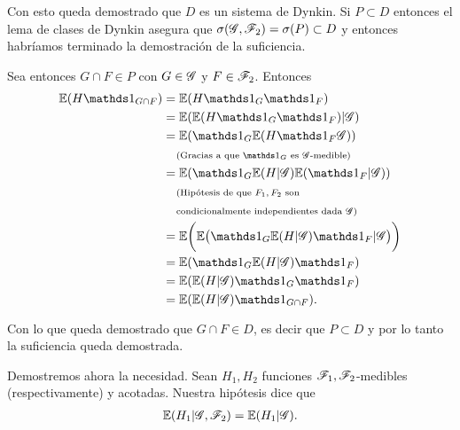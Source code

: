 Con esto queda demostrado que $D$ es un sistema de Dynkin. Si $P \subset D$ entonces el lema de clases de Dynkin asegura que
$\sigma(\mathscr{G}, \mathscr{F}_2) = \sigma(P) \subset D$ y entonces habríamos terminado la demostración de la suficiencia.\par\null

Sea entonces $G \cap F \in P$ con $G \in \mathscr{G}$ y $F \in \mathscr{F}_2$. Entonces
\begin{align}
        \E(H \indic_{G \cap F})     &=  \E(H \indic_G \indic_F)                                     \\
                                    &=  \E(\E(H \indic_G \indic_F) | \G)                            \\
                                    &=  \E(\indic_G \E(H \indic_F \G))                              \\
                                    &\comment{Gracias a que $\indic_G$ es $\G$-medible}             \\
                                    &=  \E(\indic_G \E(H | \G) \E(\indic_F | \G))                   \\
                                    &\lcomment{Hipótesis de que $F_1, F_2$ son}                     \\
                                    &\rcomment{condicionalmente independientes dada $\G$}           \\
                                    &=  \E\bigg(\E\big(\indic_G \E(H | \G) \indic_F | \G\big)\bigg) \\
                                    &=  \E(\indic_G \E(H | \G) \indic_F)                            \\
                                    &=  \E(\E(H | \G) \indic_G \indic_F)                            \\
                                    &=  \E(\E(H | \G) \indic_{G \cap F}).
\end{align}

Con lo que queda demostrado que $G \cap F \in D$, es decir que $P \subset D$ y por lo tanto la suficiencia queda demostrada.\par\null

Demostremos ahora la necesidad. Sean $H_1, H_2$ funciones $\mathscr{F}_1, \mathscr{F}_2$-medibles (respectivamente) y acotadas. Nuestra hipótesis dice que
\begin{align}
    \mathbb{E}(H_1 | \mathscr{G}, \mathscr{F}_2) = \mathbb{E}(H_1 | \mathscr{G}) \label{problema4_1:hipotesis_necesidad_4_1_2}.   
\end{align}\par\null

